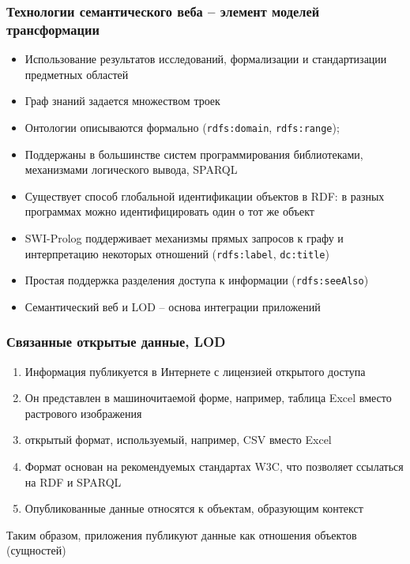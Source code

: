 \documentclass[10pt]{beamer}
\begin{document}
\begin{frame}[fragile]
  \frametitle{Технологии семантического веба -- элемент моделей трансформации}
  \begin{itemize}
  \item Использование результатов исследований, формализации и стандартизации предметных областей
  \item Граф знаний задается множеством троек
  \item Онтологии описываются формально (\verb|rdfs:domain|, \verb|rdfs:range|);
  \item Поддержаны в большинстве систем программирования библиотеками, механизмами логического вывода, SPARQL
  \item Существует способ глобальной идентификации объектов в RDF: в разных программах можно идентифицировать один о тот же объект
  \item SWI-Prolog поддерживает механизмы прямых запросов к графу и интерпретацию некоторых отношений (\verb|rdfs:label|, \verb|dc:title|)
  \item Простая поддержка разделения доступа к информации (\verb|rdfs:seeAlso|)
  \item Семантический веб и LOD -- основа интеграции приложений
  \end{itemize}
\end{frame}

\begin{frame}
\frametitle{Связанные открытые данные, LOD}
\begin{enumerate}
\item  Информация публикуется в Интернете с лицензией открытого доступа
\item  Он представлен в машиночитаемой форме, например, таблица Excel вместо растрового изображения
\item  открытый формат, используемый, например, CSV вместо Excel
\item  Формат основан на рекомендуемых стандартах W3C, что позволяет ссылаться на RDF и SPARQL
\item Опубликованные данные относятся к объектам, образующим контекст
\end{enumerate}
Таким образом, приложения публикуют данные как отношения объектов (сущностей)
\end{frame}
\end{document}
